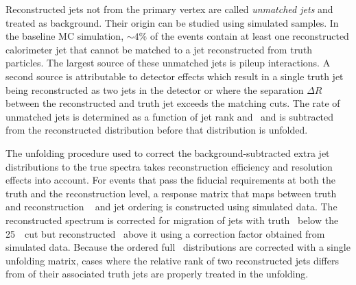 
Reconstructed jets not from the primary vertex are called \textit{unmatched jets} and treated as
background.  Their origin can be studied using simulated samples. In the baseline MC simulation, $\sim 4\%$ of the events 
contain at least one reconstructed calorimeter
jet that cannot be matched to a jet reconstructed from truth particles.  The largest
source of these unmatched jets is pileup interactions.  A second
source is attributable to  detector effects which result in a single truth jet being reconstructed as
two jets in the detector or where  the separation  $\Delta R$ between the reconstructed and truth jet
exceeds the matching cuts.  The rate of unmatched jets is determined as a function of
jet rank and  \pT\ and  is subtracted from the reconstructed distribution before that distribution is
unfolded.

The unfolding procedure used to correct the background-subtracted extra jet \pt~  distributions to the true
spectra takes  reconstruction efficiency and resolution effects
into account.  For events that pass the fiducial requirements at both the truth and the reconstruction level,
a response matrix that maps between truth and reconstruction \pt~ and jet ordering is constructed using simulated data.  The reconstructed spectrum is corrected for migration
of jets with truth \pT\ below the 25~\GeV\ cut but reconstructed \pT\ above it using
a correction factor obtained from simulated data. 
Because the ordered full \pT\  distributions
are corrected with a single unfolding matrix, cases where the relative rank of two reconstructed jets
differs from of their associated truth jets are properly treated in the unfolding.  


